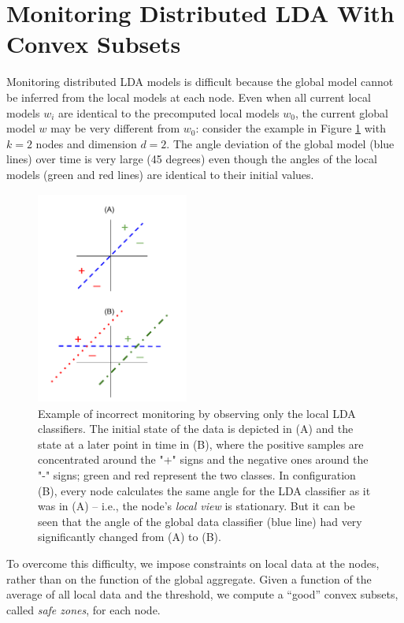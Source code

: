 \section{Monitoring Distributed LDA With Convex Subsets}
Monitoring distributed LDA models is difficult because the global model cannot be inferred from the local models at each node. Even when all current local models $w_i$ are identical to the precomputed local models $w_0$, the current global model $w$ may be very different from  $w_0$: consider the example in Figure \ref{NegativeExample} with $k = 2$ nodes and dimension $d =2$. The angle deviation of the global model (blue lines) over time is very large (45 degrees) even though the angles of the local models (green and red lines) are identical to their
initial values.

\begin{figure}[H]
\centering
\includegraphics[width=50mm, height=7cm]{graphics/NegativeExample.png}
\caption{Example of incorrect monitoring by observing only the local LDA classifiers. The
initial state of the data is depicted in (A) and the state at a later point
in time
in (B), where the positive samples are concentrated around the "+" signs and
the negative ones around the "-" signs; green and red represent the two classes.
In configuration (B), every node  calculates the same angle
for the LDA classifier as it was in (A) -- i.e., the node's \emph{local view} is
stationary. But it can be
seen that the angle of the global data classifier (blue line) had very
significantly changed from (A) to (B).}
\label{NegativeExample}
\end{figure}


\par To overcome this difficulty, we impose constraints on local data at the nodes, rather than on the function of the global aggregate. Given a function of the average of all local data and the threshold, we compute a ``good'' convex subsets, called \textit{safe zones}, for each node.

